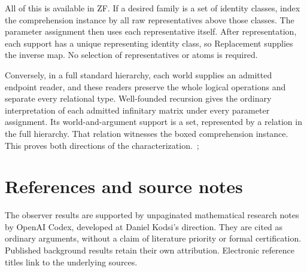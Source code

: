 \documentclass[12pt,letterpaper]{article}
\begin{document}
All of this is available in ZF. If a desired family is a set of identity classes, index the comprehension instance by all raw representatives above those classes. The parameter assignment then uses each representative itself. After representation, each support has a unique representing identity class, so Replacement supplies the inverse map. No selection of representatives or atoms is required.~\cite[\S\S3, 5]{r16}


Conversely, in a full standard hierarchy, each world supplies an admitted endpoint reader, and these readers preserve the whole logical operations and separate every relational type. Well-founded recursion gives the ordinary interpretation of each admitted infinitary matrix under every parameter assignment. Its world-and-argument support is a set, represented by a relation in the full hierarchy. That relation witnesses the boxed comprehension instance. This proves both directions of the characterization.~\cite[\S3]{r16};~\cite[\S4]{r18}


\clearpage\section*{References and source notes}

The observer results are supported by unpaginated mathematical research notes by OpenAI Codex, developed at Daniel Kodsi's direction. They are cited as ordinary arguments, without a claim of literature priority or formal certification. Published background results retain their own attribution. Electronic reference titles link to the underlying sources.
\end{document}
